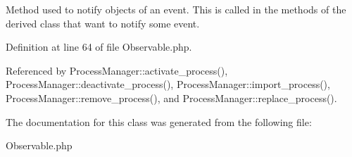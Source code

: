 Method used to notify objects of an event. This is called in the methods of the derived class that want to notify some event. 

Definition at line 64 of file Observable.php.

Referenced by Process\-Manager::activate\_\-process(), Process\-Manager::deactivate\_\-process(), Process\-Manager::import\_\-process(), Process\-Manager::remove\_\-process(), and Process\-Manager::replace\_\-process().

The documentation for this class was generated from the following file:\begin{CompactItemize}
\item 
Observable.php\end{CompactItemize}
